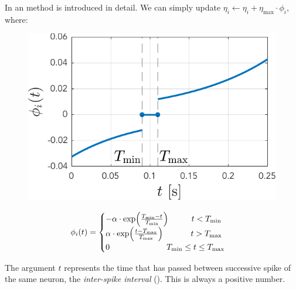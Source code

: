 In \cite{Song2017} an \IP method is introduced in detail. We can simply update $\eta_{i} \leftarrow \eta_{i} + \eta_{\max } \cdot \phi_{i}$, where: 
\begin{minipage}{.45\textwidth}
   \centering
   \begin{figure}[H]
	\centering
	\includegraphics[width = \textwidth]{../Figures/Learning/IPlearningFunction.pdf}
	\label{fig:IPlearningFunction}
	\end{figure}
\end{minipage}
\begin{minipage}{.55\textwidth}
\begin{align}
	\phi_{i} (t) =
	\begin{cases}
	-\alpha \cdot \exp \left(\frac{T_{\min }-t}{T_{\rm min }}\right) \hspace{10mm} t<T_{ \rm min } \\ 
	\alpha \cdot \exp \left(\frac{t-T_{\rm max }}{T_{\max }}\right) \hspace{12mm} t >T_{\rm max } \\ 
	0 \hspace{24.5mm} T_{ \rm min } \leq t \leq T_{\rm max }
	\end{cases}
\end{align}
\vspace{10mm}
\end{minipage}
The argument $t$ represents the time that has passed between successive spike of the same neuron, the \textsl{inter-spike interval} (\ISI). This is always a positive number. \\




